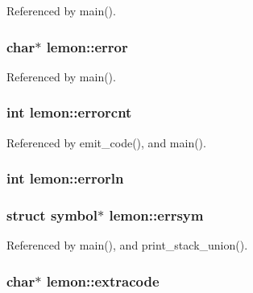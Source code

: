 Referenced by main().

\hypertarget{structlemon_a294f54d8e2db01b97128787f4fcaf663}{
\subsubsection[{error}]{\setlength{\rightskip}{0pt plus 5cm}char$\ast$ lemon\-::error}}\label{structlemon_a294f54d8e2db01b97128787f4fcaf663}


Referenced by main().

\hypertarget{structlemon_a3cf1bbc0784190e828d6e9aa97e0c387}{
\subsubsection[{errorcnt}]{\setlength{\rightskip}{0pt plus 5cm}int lemon\-::errorcnt}}\label{structlemon_a3cf1bbc0784190e828d6e9aa97e0c387}


Referenced by emit\-\_\-code(), and main().

\hypertarget{structlemon_a4c5c22017ce6a6349580508013f0fef8}{
\subsubsection[{errorln}]{\setlength{\rightskip}{0pt plus 5cm}int lemon\-::errorln}}\label{structlemon_a4c5c22017ce6a6349580508013f0fef8}
\hypertarget{structlemon_abc9604a50182ad25f9adac62c9af6b1c}{
\subsubsection[{errsym}]{\setlength{\rightskip}{0pt plus 5cm}struct {\bf symbol}$\ast$ lemon\-::errsym}}\label{structlemon_abc9604a50182ad25f9adac62c9af6b1c}


Referenced by main(), and print\-\_\-stack\-\_\-union().

\hypertarget{structlemon_ac4795352f79823338f9eb6861e996b24}{
\subsubsection[{extracode}]{\setlength{\rightskip}{0pt plus 5cm}char$\ast$ lemon\-::extracode}}\label{structlemon_ac4795352f79823338f9eb6861e996b24}


